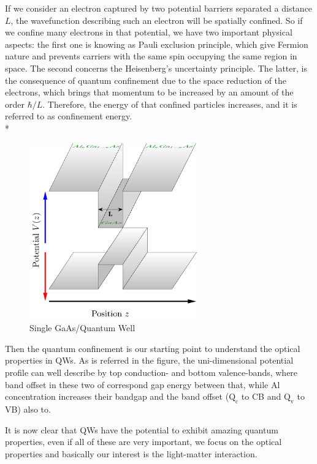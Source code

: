 If we consider an electron captured by two potential barriers separated a distance $L$, the wavefunction describing such an electron will be spatially confined.
So if we confine many electrons in that potential,  we have two important physical aspects: the first one is knowing as Pauli exclusion principle, which give Fermion nature and prevents carriers with the same spin occupying the same region in  space\cite{harrison2016quantum,pauli1925zusammenhang}. The second  concerns the Heisenberg's uncertainty principle. 
The latter, is the consequence of quantum confinement due to the space reduction of the electrons, which brings that momentum to be increased by an amount of the order $\hbar/L$. Therefore, the energy of that confined particles increases, and it is referred to as confinement energy\cite{cardona2005fundamentals}. \\*
\begin{figure}
	\centering
	\includegraphics[width=0.65\textwidth]{../figures/chapter-1/heterostructures/out/qw1}
	\caption{Single GaAs/\algaas Quantum Well }
	\label{fig:subsection-1.2-single-quantum-well-scheme}
\end{figure}
Then the quantum confinement is our starting point to understand the optical properties in \gls{QW}s. As is referred in the figure, the uni-dimensional potential profile can well describe by top conduction- and bottom valence-bands, where band offset in these two of correspond gap energy between that, while Al concentration increases their bandgap and the band offset ($\mathrm{Q_{c}}$ to \gls{CB} and $\mathrm{Q_{v}}$ to \gls{VB}) also to.   

It is  now clear  that  \gls{QW}s have the potential to exhibit amazing quantum properties, even if all of these are very important, we focus on the optical properties and basically our interest is the light-matter interaction.  
 
